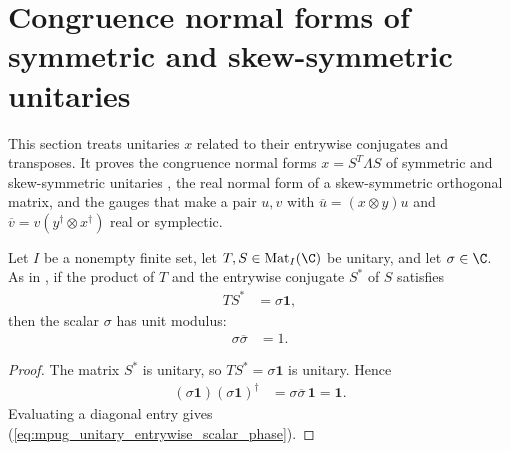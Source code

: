 \section{Congruence normal forms of symmetric and skew-symmetric unitaries}

This section treats unitaries $x$ related to their entrywise conjugates and
transposes. It proves the congruence normal forms $x=S^T\Lambda S$ of
symmetric and skew-symmetric unitaries
\cite[Lemma~\texttt{lemma:conjclass-normalform-continuous}]{Cirac2017MPU},
the real normal form of a skew-symmetric orthogonal matrix, and the gauges
that make a pair $u,v$ with $\overline u=(x\otimes y)u$ and
$\overline v=v(y^\dagger\otimes x^\dagger)$ real or symplectic.

\begin{lemma}
    \label{thm:mpug_unitary_entrywise_scalar_phase}
    \leanok
    Let $I$ be a nonempty finite set, let $T,S\in\operatorname{Mat}_I(\C)$ be
    unitary, and let $\sigma\in\C$. As in
    \cite[lines~1557--1562]{FrancoRubio2025MPUGauging}, if the product of
    $T$ and the entrywise conjugate $S^*$ of $S$ satisfies
    \begin{align}
        TS^* & =\sigma\mathbf 1,
        \label{eq:mpug_unitary_entrywise_scalar_relation}
    \end{align}
    then the scalar $\sigma$ has unit modulus:
    \begin{align}
        \sigma\overline\sigma & =1.
        \label{eq:mpug_unitary_entrywise_scalar_phase}
    \end{align}
\end{lemma}

\begin{proof}\leanok
    The matrix $S^*$ is unitary, so $TS^*=\sigma\mathbf 1$ is unitary. Hence
    \begin{align}
        (\sigma\mathbf 1)(\sigma\mathbf 1)^\dagger
         & =\sigma\overline\sigma\,\mathbf 1=\mathbf 1.
    \end{align}
    Evaluating a diagonal entry gives
    (\ref{eq:mpug_unitary_entrywise_scalar_phase}).
\end{proof}

